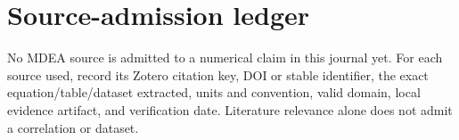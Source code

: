 \section{Source-admission ledger}

No MDEA source is admitted to a numerical claim in this journal yet. For each source used,
record its Zotero citation key, DOI or stable identifier, the exact equation/table/dataset
extracted, units and convention, valid domain, local evidence artifact, and verification date.
Literature relevance alone does not admit a correlation or dataset.
